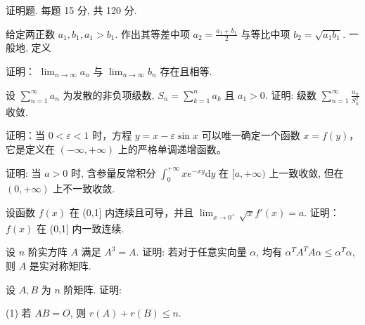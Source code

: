 \par{}
证明题. 每题 15 分, 共 120 分.\par
\par{}
给定两正数 $a_1, b_1, a_1 > b_1$. 作出其等差中项 $a_2 = \frac{a_1 + b_1}{2}$ 与等比中项 $b_2 = \sqrt{a_1b_1}$. 一般地, 定义\par
\nopagebreak[4]
证明： $\lim_{n\to \infty}a_n$ 与 $\lim_{n\to \infty}b_n$ 存在且相等.\par
设 $\sum_{n=1}^{\infty} a_n$ 为发散的非负项级数, $S_n = \sum_{k=1}^{n} a_k$ 且 $a_1 > 0$. 证明: 级数 $\sum_{n=1}^{\infty} \frac{a_n}{S_n^2}$ 收敛.\par
证明：当 $0 < \varepsilon < 1$ 时，方程 $y = x - \varepsilon \sin x$ 可以唯一确定一个函数 $x = f(y)$，它是定义在 $(- \infty, +\infty)$ 上的严格单调递增函数。\par
证明: 当 $a > 0$ 时, 含参量反常积分 $\int_{0}^{+\infty} x e^{-xy} \mathrm{d}y$ 在 $[a, +\infty)$ 上一致收敛, 但在 $(0, +\infty)$ 上不一致收敛.\par
设函数 $f(x)$ 在 (0,1] 内连续且可导，并且 $\lim_{x\to 0^+}\sqrt{x} f'(x) = a$. 证明：$f(x)$ 在 (0,1] 内一致连续.\par
设 $n$ 阶实方阵 $A$ 满足 $A^3 = A$. 证明: 若对于任意实向量 $\alpha$, 均有 $\alpha^T A^T A \alpha \leq \alpha^T \alpha$, 则 $A$ 是实对称矩阵.\par
设 $A, B$ 为 $n$ 阶矩阵. 证明:\par
(1) 若 $AB = O$, 则 $r(A) + r(B) \leq n$.\par
